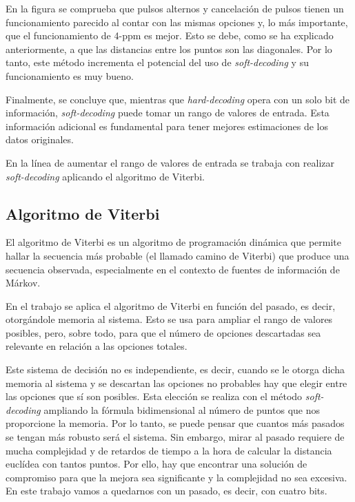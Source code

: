 En la figura se comprueba que pulsos alternos y cancelación de pulsos tienen un 
funcionamiento parecido al contar con las mismas opciones y, lo más importante, que
el funcionamiento de 4-ppm es mejor. Esto se debe, como se ha explicado anteriormente,
a que las distancias entre los puntos son las diagonales. Por lo tanto,
este método incrementa el potencial del 
uso de \textit{soft-decoding} y su funcionamiento es muy bueno. 

Finalmente, se concluye que, mientras que \textit{hard-decoding} opera con un solo bit de 
información, \textit{soft-decoding} puede tomar un rango de valores de entrada. Esta 
información adicional es fundamental para tener mejores estimaciones de los datos
originales.

En la línea de aumentar el rango de valores de entrada se trabaja con realizar 
\textit{soft-decoding} aplicando el algoritmo de Viterbi.


\subsection{Algoritmo de Viterbi}
El algoritmo de Viterbi es un algoritmo de programación dinámica que permite hallar 
la secuencia más probable (el llamado camino de Viterbi) que produce 
una secuencia observada, especialmente en el contexto de fuentes de información 
de Márkov. \cite{viterbi}

En el trabajo se aplica el algoritmo de Viterbi en función del pasado, es decir, 
otorgándole memoria al sistema. Esto se usa para ampliar el rango de valores posibles, 
pero, sobre todo, para que el número de opciones descartadas sea relevante en relación a
las opciones totales.

Este sistema de decisión no es independiente, es decir, cuando se le otorga dicha 
memoria al sistema y se descartan las opciones no probables hay que elegir entre las
opciones que sí son posibles. Esta elección se realiza con el método 
\textit{soft-decoding} ampliando la fórmula bidimensional al número de puntos que 
nos proporcione la memoria. Por lo tanto, se puede pensar que cuantos más pasados 
se tengan más robusto será el sistema. Sin embargo, mirar al pasado requiere de mucha
complejidad y de retardos de tiempo a la hora de calcular la distancia euclídea con 
tantos puntos. Por ello, hay que encontrar una solución de compromiso para que la mejora
sea significante y la complejidad no sea excesiva. En este trabajo vamos a quedarnos 
con un pasado, es decir, con cuatro bits.

